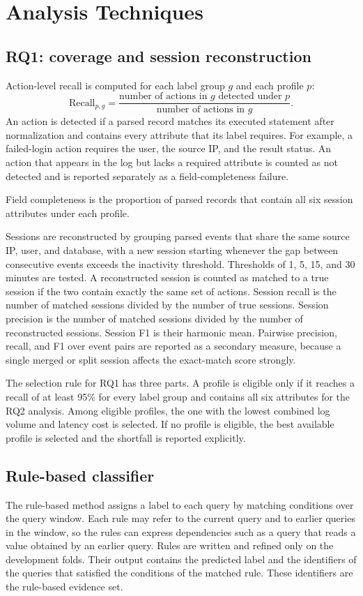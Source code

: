 \documentclass[12pt,a4paper]{report}
\begin{document}
\section{Analysis Techniques}
\label{sec:analysis}
\subsection{RQ1: coverage and session reconstruction}
Action-level recall is computed for each label group $g$ and each profile $p$:
\[
\mathrm{Recall}_{p,g} = \frac{\text{number of actions in } g \text{ detected under } p}{\text{number of actions in } g}.
\]
An action is detected if a parsed record matches its executed statement after normalization and contains every attribute that its label requires. For example, a failed-login action requires the user, the source IP, and the result status. An action that appears in the log but lacks a required attribute is counted as not detected and is reported separately as a field-completeness failure.

Field completeness is the proportion of parsed records that contain all six session attributes under each profile.

Sessions are reconstructed by grouping parsed events that share the same source IP, user, and database, with a new session starting whenever the gap between consecutive events exceeds the inactivity threshold. Thresholds of 1, 5, 15, and 30 minutes are tested. A reconstructed session is counted as matched to a true session if the two contain exactly the same set of actions. Session recall is the number of matched sessions divided by the number of true sessions. Session precision is the number of matched sessions divided by the number of reconstructed sessions. Session F1 is their harmonic mean. Pairwise precision, recall, and F1 over event pairs are reported as a secondary measure, because a single merged or split session affects the exact-match score strongly.

The selection rule for RQ1 has three parts. A profile is eligible only if it reaches a recall of at least 95\% for every label group and contains all six attributes for the RQ2 analysis. Among eligible profiles, the one with the lowest combined log volume and latency cost is selected. If no profile is eligible, the best available profile is selected and the shortfall is reported explicitly.

\subsection{Rule-based classifier}
The rule-based method assigns a label to each query by matching conditions over the query window. Each rule may refer to the current query and to earlier queries in the window, so the rules can express dependencies such as a query that reads a value obtained by an earlier query. Rules are written and refined only on the development folds. Their output contains the predicted label and the identifiers of the queries that satisfied the conditions of the matched rule. These identifiers are the rule-based evidence set.
\end{document}
